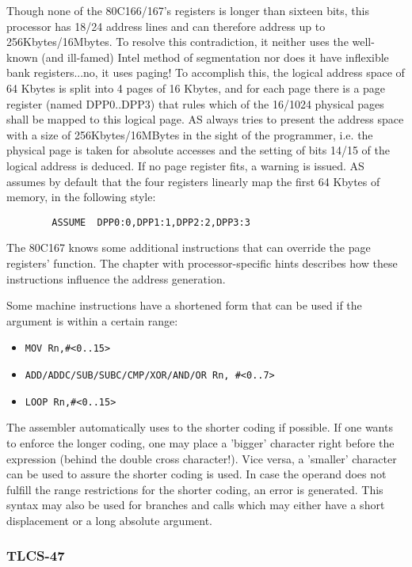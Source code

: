 \documentclass[12pt,twoside]{report}
\newcommand{\asname}{{AS}}
\begin{document}
Though none of the 80C166/167's registers is longer than sixteen bits,
this processor has 18/24 address lines and can therefore address up
to 256Kbytes/16Mbytes.  To resolve this contradiction, it neither
uses the well-known (and ill-famed) Intel method of segmentation nor
does it have inflexible bank registers...no, it uses paging!  To accomplish
this, the logical address space of 64 Kbytes is split into 4 pages of
16 Kbytes, and for each page there is a page register (named
DPP0..DPP3) that rules which of the 16/1024 physical pages shall be
mapped to this logical page.  \asname{} always tries to present the address
space with a size of 256Kbytes/16MBytes in the sight of the
programmer, i.e. the physical page is taken for absolute accesses and
the setting of bits 14/15 of the logical address is deduced.  If no
page register fits, a warning is issued.  \asname{} assumes by default that
the four registers linearly map the first 64 Kbytes of memory, in the
following style:
\begin{verbatim}
        ASSUME  DPP0:0,DPP1:1,DPP2:2,DPP3:3
\end{verbatim}
The 80C167 knows some additional instructions that can override the
page registers' function.  The chapter with processor-specific hints
describes how these instructions influence the address generation.
\par
Some machine instructions have a shortened form that can be used if
the argument is within a certain range:
\begin{itemize}
\item{\verb!MOV Rn,#<0..15>!}
\item{\verb!ADD/ADDC/SUB/SUBC/CMP/XOR/AND/OR Rn, #<0..7>!}
\item{\verb!LOOP Rn,#<0..15>!}
\end{itemize}
The assembler automatically uses to the shorter coding if possible.
If one wants to enforce the longer coding, one may place a 'bigger'
character right before the expression (behind the double cross character!).
Vice versa, a 'smaller' character can be used to assure the shorter
coding is used.  In case the operand does not fulfill the range
restrictions for the shorter coding, an error is generated.  This syntax
may also be used for branches and calls which may either have a short
displacement or a long absolute argument.


\subsubsection{TLCS-47}
\end{document}
